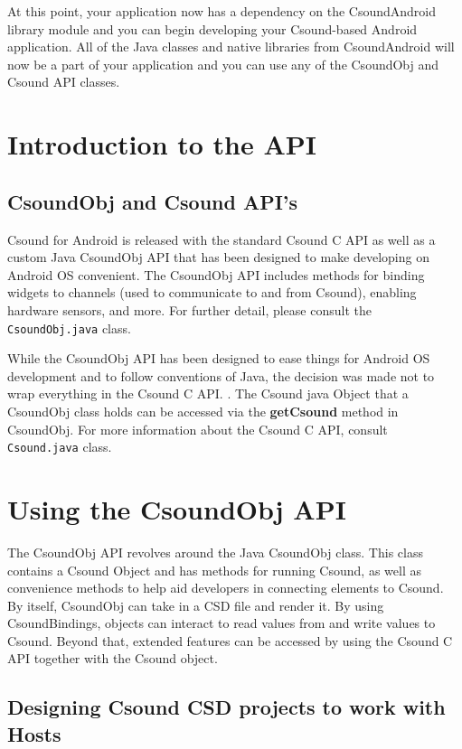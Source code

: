 \documentclass[11pt]{article}
\begin{document}
At this point, your application now has a dependency on the CsoundAndroid library module and you can begin developing your Csound-based Android application. All of the Java classes and native libraries from CsoundAndroid will now be a part of your application and you can use any of the CsoundObj and Csound API classes. 


\section{Introduction to the API}
\subsection{CsoundObj and Csound API's}

Csound for Android is released with the standard Csound C API as well as a custom Java CsoundObj API that has been designed to make developing on Android OS convenient.  The CsoundObj API includes methods for binding widgets to channels (used to communicate to and from Csound), enabling hardware sensors, and more.  For further detail, please consult the \texttt{CsoundObj.java} class.

While the CsoundObj API has been designed to ease things for Android OS development and to follow conventions of Java, the decision was made not to wrap everything in the Csound C API. . The Csound java Object that a CsoundObj class holds can be accessed via the \textbf{getCsound} method in CsoundObj.  For more information about the Csound C API, consult \texttt{Csound.java} class.

\section{Using the CsoundObj API}

The CsoundObj API revolves around the Java CsoundObj class. This class contains a Csound Object and has methods for running Csound, as well as convenience methods to help aid developers in connecting elements to Csound. By itself, CsoundObj can take in a CSD file and render it.  By using CsoundBindings, objects can interact to read values from and write values to Csound.  Beyond that, extended features can be accessed by using the Csound C API together with the Csound object.

\subsection{Designing Csound CSD projects to work with Hosts}
\end{document}
